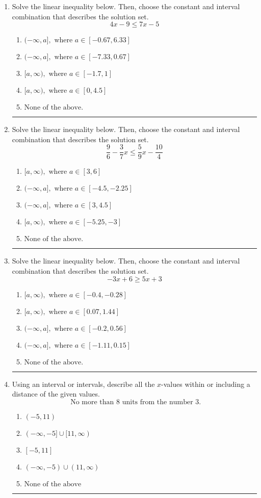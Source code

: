 \documentclass[14pt]{extbook}
\newcommand{\litem}[1]{\item#1\hspace*{-1cm}\rule{\textwidth}{0.4pt}}
\begin{document}
\begin{enumerate}
{\begin{enumerate}[label=\Alph*.]
\end{enumerate} }
\litem{
Solve the linear inequality below. Then, choose the constant and interval combination that describes the solution set.\[ 4x -9 \leq 7x -5 \]\begin{enumerate}[label=\Alph*.]
\item \( (-\infty, a], \text{ where } a \in [-0.67, 6.33] \)
\item \( (-\infty, a], \text{ where } a \in [-7.33, 0.67] \)
\item \( [a, \infty), \text{ where } a \in [-1.7, 1] \)
\item \( [a, \infty), \text{ where } a \in [0, 4.5] \)
\item \( \text{None of the above}. \)

\end{enumerate} }
\litem{
Solve the linear inequality below. Then, choose the constant and interval combination that describes the solution set.\[ \frac{9}{6} - \frac{3}{7} x \leq \frac{5}{9} x - \frac{10}{4} \]\begin{enumerate}[label=\Alph*.]
\item \( [a, \infty), \text{ where } a \in [3, 6] \)
\item \( (-\infty, a], \text{ where } a \in [-4.5, -2.25] \)
\item \( (-\infty, a], \text{ where } a \in [3, 4.5] \)
\item \( [a, \infty), \text{ where } a \in [-5.25, -3] \)
\item \( \text{None of the above}. \)

\end{enumerate} }
\litem{
Solve the linear inequality below. Then, choose the constant and interval combination that describes the solution set.\[ -3x + 6 \geq 5x + 3 \]\begin{enumerate}[label=\Alph*.]
\item \( [a, \infty), \text{ where } a \in [-0.4, -0.28] \)
\item \( [a, \infty), \text{ where } a \in [0.07, 1.44] \)
\item \( (-\infty, a], \text{ where } a \in [-0.2, 0.56] \)
\item \( (-\infty, a], \text{ where } a \in [-1.11, 0.15] \)
\item \( \text{None of the above}. \)

\end{enumerate} }
\litem{
Using an interval or intervals, describe all the $x$-values within or including a distance of the given values.\[ \text{ No more than } 8 \text{ units from the number } 3. \]\begin{enumerate}[label=\Alph*.]
\item \( (-5, 11) \)
\item \( (-\infty, -5] \cup [11, \infty) \)
\item \( [-5, 11] \)
\item \( (-\infty, -5) \cup (11, \infty) \)
\item \( \text{None of the above} \)


\end{enumerate}}
\end{enumerate}
\end{document}
